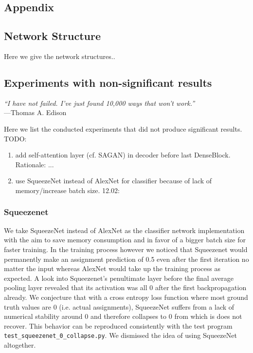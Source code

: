 \documentclass[12pt,a4paper]{article}
\begin{document}
\begin{appendices}
\section{Appendix}
\subsection{Network Structure}
Here we give the network structures..


\subsection{Experiments with non-significant results}\label{app:failed_exps}
\begin{flushright}
\rightskip=2.8cm\textit{``I have not failed. I've just found 10,000 ways that won't work.''} \\
\vspace{.2em}
\rightskip=1.8cm---Thomas A. Edison
\end{flushright}
Here we list the conducted experiments that did not produce significant results. TODO:
\begin{enumerate}
  \item add self-attention layer (cf. SAGAN) in decoder before last DenseBlock. Rationale: ...
  \item use SqueezeNet instead of AlexNet for classifier because of lack of memory/increase batch size. 12.02: 
\end{enumerate}

\subsubsection{Squeezenet}
We take SqueezeNet instead of AlexNet as the classifier network implementation with the aim to save memory consumption and in favor of a bigger batch size for faster training. In the training process however we noticed that Squeezenet would permanently make an assignment prediction of 0.5 even after the first iteration no matter the input whereas AlexNet would take up the training process as expected. A look into Squeezenet's penultimate layer before the final average pooling layer revealed that its activation was all 0 after the first backpropagation already. We conjecture that with a cross entropy loss function where most ground truth values are 0 (i.e. actual assignments), SqueezeNet suffers from a lack of numerical stability around 0 and therefore collapses to 0 from which is does not recover. This behavior can be reproduced consistently with the test program \texttt{test\_squeezenet\_0\_collapse.py}. We dismissed the idea of using SqueezeNet altogether.


\end{appendices}
\end{document}
